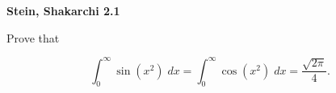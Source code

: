\textbf{Stein, Shakarchi 2.1}

Prove that 

$$
\int_{0}^{\infty}{\sin{\left( x^2 \right)} \; dx} = \int_{0}^{\infty}{\cos{\left( x^2 \right)} \; dx} 
                                                  = \frac{\sqrt{2\pi}}{4}.
$$

\begin{solution}
    \ \\
\end{solution}